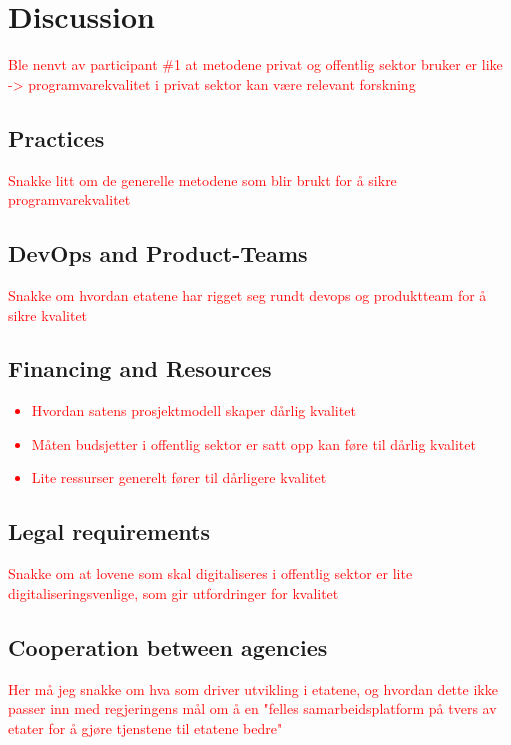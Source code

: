 \chapter{Discussion}

\textcolor{red}{Ble nenvt av participant \#1 at metodene privat og offentlig sektor bruker er like -> programvarekvalitet i privat sektor kan være relevant forskning}

\section{Practices}
\textcolor{red}{Snakke litt om de generelle metodene som blir brukt for å sikre programvarekvalitet}

\section{DevOps and Product-Teams}
\textcolor{red}{Snakke om hvordan etatene har rigget seg rundt devops og produktteam for å sikre kvalitet}

\section{Financing and Resources}
\textcolor{red}{\begin{itemize}
    \item Hvordan satens prosjektmodell skaper dårlig kvalitet
    \item Måten budsjetter i offentlig sektor er satt opp kan føre til dårlig kvalitet
    \item Lite ressurser generelt fører til dårligere kvalitet
\end{itemize}}

\section{Legal requirements}
\textcolor{red}{Snakke om at lovene som skal digitaliseres i offentlig sektor er lite digitaliseringsvenlige, som gir utfordringer for kvalitet}

\section{Cooperation between agencies}
\textcolor{red}{Her må jeg snakke om hva som driver utvikling i etatene, og hvordan dette ikke passer inn med regjeringens mål om å en "felles samarbeidsplatform på tvers av etater for å gjøre tjenstene til etatene bedre"}

